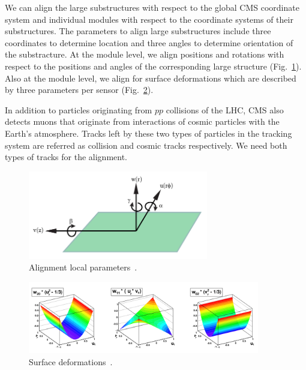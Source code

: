 We can align the large substructures with respect to the global CMS coordinate system and individual modules with respect to the coordinate systems of their substructures. The parameters to align large substructures include three coordinates to determine location and three angles to determine orientation of the substracture. At the module level, we align positions and rotations with respect to the positions and angles of the corresponding large structure (Fig.~\ref{fig:alignmentParameters}). Also at the module level, we align for surface deformations which are described by three parameters per sensor (Fig.~\ref{fig:surfaceDeformations}). 

In addition to particles originating from $pp$ collisions of the LHC, CMS also detects muons that originate from interactions of cosmic particles with the Earth's atmosphere. Tracks left by these two types of particles in the tracking system are referred as collision and cosmic tracks respectively. We need both types of tracks for the alignment. %

\begin{figure}[htb]
    \begin{center}
        \includegraphics[width=0.70\textwidth]{../figs/Alignment/alignment_strip_coords.png}
    \end{center}
    \caption{Alignment local parameters~\cite{ref_Frank_thesis}.}
    \label{fig:alignmentParameters}
\end{figure}

\begin{figure}[htb]
    \begin{center}
        \includegraphics[width=0.90\textwidth]{../figs/Alignment/alignment_surface_deformations.png}
    \end{center}
    \caption{Surface deformations~\cite{ref_Alignment}.}
    \label{fig:surfaceDeformations}
\end{figure}

